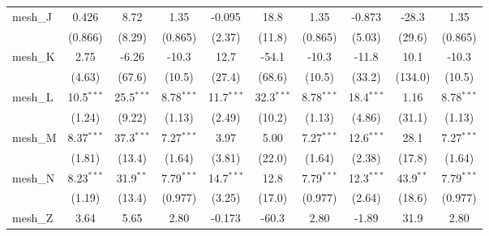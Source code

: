 \begin{tabular}{lccccccccc}
   mesh\_J                                                     & 0.426         & 8.72          & 1.35          & -0.095         & 18.8           & 1.35          & -0.873        & -28.3         & 1.35\\   
                                                               & (0.866)       & (8.29)        & (0.865)       & (2.37)         & (11.8)         & (0.865)       & (5.03)        & (29.6)        & (0.865)\\   
   mesh\_K                                                     & 2.75          & -6.26         & -10.3         & 12.7           & -54.1          & -10.3         & -11.8         & 10.1          & -10.3\\   
                                                               & (4.63)        & (67.6)        & (10.5)        & (27.4)         & (68.6)         & (10.5)        & (33.2)        & (134.0)       & (10.5)\\   
   mesh\_L                                                     & 10.5$^{***}$  & 25.5$^{***}$  & 8.78$^{***}$  & 11.7$^{***}$   & 32.3$^{***}$   & 8.78$^{***}$  & 18.4$^{***}$  & 1.16          & 8.78$^{***}$\\   
                                                               & (1.24)        & (9.22)        & (1.13)        & (2.49)         & (10.2)         & (1.13)        & (4.86)        & (31.1)        & (1.13)\\   
   mesh\_M                                                     & 8.37$^{***}$  & 37.3$^{***}$  & 7.27$^{***}$  & 3.97           & 5.00           & 7.27$^{***}$  & 12.6$^{***}$  & 28.1          & 7.27$^{***}$\\   
                                                               & (1.81)        & (13.4)        & (1.64)        & (3.81)         & (22.0)         & (1.64)        & (2.38)        & (17.8)        & (1.64)\\   
   mesh\_N                                                     & 8.23$^{***}$  & 31.9$^{**}$   & 7.79$^{***}$  & 14.7$^{***}$   & 12.8           & 7.79$^{***}$  & 12.3$^{***}$  & 43.9$^{**}$   & 7.79$^{***}$\\   
                                                               & (1.19)        & (13.4)        & (0.977)       & (3.25)         & (17.0)         & (0.977)       & (2.64)        & (18.6)        & (0.977)\\   
   mesh\_Z                                                     & 3.64          & 5.65          & 2.80          & -0.173         & -60.3          & 2.80          & -1.89         & 31.9          & 2.80\\   

\end{tabular}
